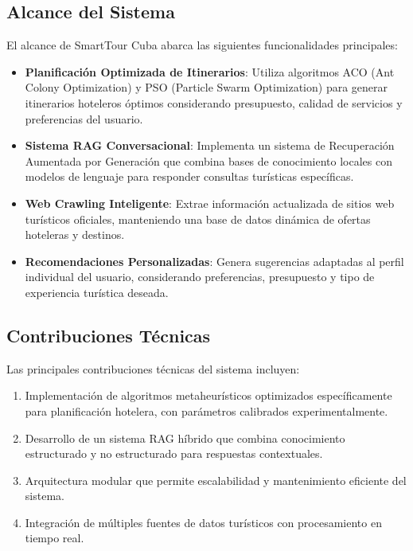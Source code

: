 \documentclass[runningheads]{llncs}
\begin{document}
\subsection{Alcance del Sistema}

El alcance de SmartTour Cuba abarca las siguientes funcionalidades principales:

\begin{itemize}
\item \textbf{Planificación Optimizada de Itinerarios}: Utiliza algoritmos ACO (Ant Colony Optimization) y PSO (Particle Swarm Optimization) para generar itinerarios hoteleros óptimos considerando presupuesto, calidad de servicios y preferencias del usuario.

\item \textbf{Sistema RAG Conversacional}: Implementa un sistema de Recuperación Aumentada por Generación que combina bases de conocimiento locales con modelos de lenguaje para responder consultas turísticas específicas.

\item \textbf{Web Crawling Inteligente}: Extrae información actualizada de sitios web turísticos oficiales, manteniendo una base de datos dinámica de ofertas hoteleras y destinos.

\item \textbf{Recomendaciones Personalizadas}: Genera sugerencias adaptadas al perfil individual del usuario, considerando preferencias, presupuesto y tipo de experiencia turística deseada.


\end{itemize}

\subsection{Contribuciones Técnicas}

Las principales contribuciones técnicas del sistema incluyen:

\begin{enumerate}
\item Implementación de algoritmos metaheurísticos optimizados específicamente para planificación hotelera, con parámetros calibrados experimentalmente.

\item Desarrollo de un sistema RAG híbrido que combina conocimiento estructurado y no estructurado para respuestas contextuales.

\item Arquitectura modular que permite escalabilidad y mantenimiento eficiente del sistema.

\item Integración de múltiples fuentes de datos turísticos con procesamiento en tiempo real.
\end{enumerate}
\end{document}
